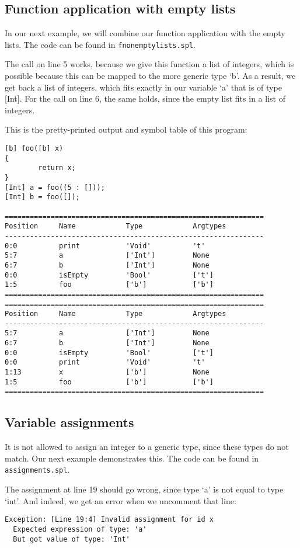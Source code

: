 \documentclass[a4paper]{article}
\begin{document}
\subsection{Function application with empty lists}
In our next example, we will combine our function application with the empty lists. The code can be found in {\tt fnonemptylists.spl}.

The call on line 5 works, because we give this function a list of integers, which is possible because this can be mapped to the more generic type `b'. As a result, we get back a list of integers, which fits exactly in our variable `a' that is of type [Int]. For the call on line 6, the same holds, since the empty list fits in a list of integers. 

This is the pretty-printed output and symbol table of this program: 
\begin{verbatim}
[b] foo([b] x)
{
        return x;
}
[Int] a = foo((5 : []));
[Int] b = foo([]);

==============================================================
Position     Name            Type            Argtypes            
--------------------------------------------------------------
0:0          print           'Void'          't'                 
5:7          a               ['Int']         None                
6:7          b               ['Int']         None                
0:0          isEmpty         'Bool'          ['t']               
1:5          foo             ['b']           ['b']               
==============================================================
==============================================================
Position     Name            Type            Argtypes            
--------------------------------------------------------------
5:7          a               ['Int']         None                
6:7          b               ['Int']         None                
0:0          isEmpty         'Bool'          ['t']               
0:0          print           'Void'          't'                 
1:13         x               ['b']           None                
1:5          foo             ['b']           ['b']               
==============================================================
\end{verbatim}

\subsection{Variable assignments}
\label{var-assign}
It is not allowed to assign an integer to a generic type, since these types do not match. Our next example demonstrates this. The code can be found in {\tt assignments.spl}. 

The assignment at line 19 should go wrong, since type `a' is not equal to type `int'. And indeed, we get an error when we uncomment that line: 
\begin{verbatim}
Exception: [Line 19:4] Invalid assignment for id x
  Expected expression of type: 'a'
  But got value of type: 'Int'
\end{verbatim}
\end{document}
